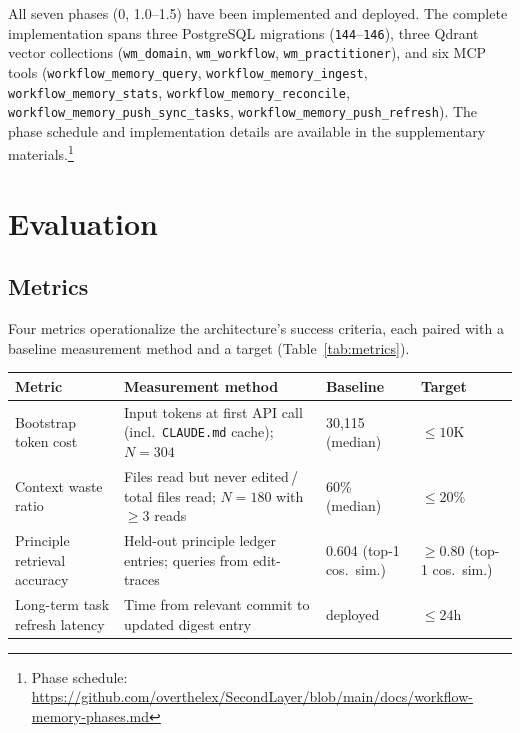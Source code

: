 \documentclass[11pt]{article}
\begin{document}
All seven phases (0, 1.0--1.5) have been implemented and deployed.
The complete implementation spans three PostgreSQL migrations (\texttt{144}--\texttt{146}), three Qdrant vector collections (\texttt{wm\_domain}, \texttt{wm\_workflow}, \texttt{wm\_practitioner}), and six MCP tools (\texttt{workflow\_memory\_query}, \texttt{workflow\_memory\_ingest}, \texttt{workflow\_memory\_stats}, \texttt{workflow\_memory\_reconcile}, \texttt{workflow\_memory\_push\_sync\_tasks}, \texttt{workflow\_memory\_push\_refresh}).
The phase schedule and implementation details are available in the supplementary materials.\footnote{Phase schedule: \url{https://github.com/overthelex/SecondLayer/blob/main/docs/workflow-memory-phases.md}}


\section{Evaluation}
\label{sec:evaluation}

\subsection{Metrics}
\label{sec:metrics}

Four metrics operationalize the architecture's success criteria, each paired with a baseline measurement method and a target (Table~\ref{tab:metrics}).

\vspace{0.5em}
\noindent
\begin{minipage}{\textwidth}
\centering
\footnotesize
\setlength{\tabcolsep}{4pt}
\label{tab:metrics}
\vspace{0.3em}
\begin{tabular}{@{}p{2.5cm} p{3.5cm} p{2.8cm} p{2.8cm}@{}}
\toprule
\textbf{Metric} & \textbf{Measurement method} & \textbf{Baseline} & \textbf{Target} \\
\midrule
Bootstrap token cost &
  Input tokens at first API call (incl.\ \texttt{CLAUDE.md} cache); $N{=}304$ &
  30{,}115 (median) & ${\leq}10$K \\[4pt]
Context waste ratio &
  Files read but never edited\,/\,total files read; $N{=}180$ with ${\geq}3$ reads &
  60\% (median) & ${\leq}20\%$ \\[4pt]
Principle retrieval accuracy &
  Held-out principle ledger entries; queries from edit-traces &
  0.604 (top-1 cos.\ sim.) & ${\geq}0.80$ (top-1 cos.\ sim.) \\[4pt]
Long-term task refresh latency &
  Time from relevant commit to updated digest entry &
  deployed & ${\leq}24$h \\
\bottomrule
\end{tabular}
\end{minipage}
\vspace{0.5em}
\end{document}
